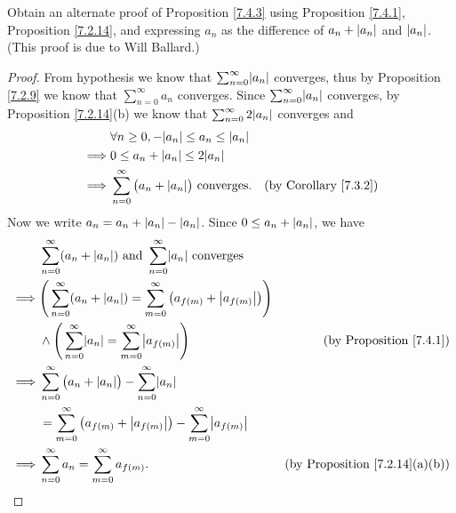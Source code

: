 \begin{exercise}\label{ex 7.4.2}
    Obtain an alternate proof of Proposition \ref{7.4.3} using Proposition \ref{7.4.1}, Proposition \ref{7.2.14}, and expressing \(a_n\) as the difference of \(a_n + \abs*{a_n}\) and \(\abs*{a_n}\).
    (This proof is due to Will Ballard.)
\end{exercise}

\begin{proof}
    From hypothesis we know that \(\sum_{n = 0}^\infty \abs*{a_n}\) converges, thus by Proposition \ref{7.2.9} we know that \(\sum_{n = 0}^\infty a_n\) converges.
    Since \(\sum_{n = 0}^\infty \abs*{a_n}\) converges, by Proposition \ref{7.2.14}(b) we know that \(\sum_{n = 0}^\infty 2 \abs*{a_n}\) converges and
    \begin{align*}
                 & \forall n \geq 0, -\abs*{a_n} \leq a_n \leq \abs*{a_n}                                                \\
        \implies & 0 \leq a_n + \abs*{a_n} \leq 2\abs*{a_n}                                                              \\
        \implies & \sum_{n = 0}^\infty \big(a_n + \abs*{a_n}\big) \text{ converges}. & \text{(by Corollary \ref{7.3.2})}
    \end{align*}
    Now we write \(a_n = a_n + \abs*{a_n} - \abs*{a_n}\).
    Since \(0 \leq a_n + \abs*{a_n}\), we have
    \begin{align*}
                 & \sum_{n = 0}^\infty (a_n + \abs*{a_n}) \text{ and } \sum_{n = 0}^\infty \abs*{a_n} \text{ converges}                                                       \\
        \implies & \Bigg(\sum_{n = 0}^\infty (a_n + \abs*{a_n}) = \sum_{m = 0}^\infty \big(a_{f(m)} + \abs*{a_{f(m)}}\big)\Bigg)                                              \\
                 & \land \Bigg(\sum_{n = 0}^\infty \abs*{a_n} = \sum_{m = 0}^\infty \abs*{a_{f(m)}}\Bigg)                        & \text{(by Proposition \ref{7.4.1})}        \\
        \implies & \sum_{n = 0}^\infty \big(a_n + \abs*{a_n}\big) - \sum_{n = 0}^\infty \abs*{a_n}                                                                            \\
                 & = \sum_{m = 0}^\infty \big(a_{f(m)} + \abs*{a_{f(m)}}\big) - \sum_{m = 0}^\infty \abs*{a_{f(m)}}                                                           \\
        \implies & \sum_{n = 0}^\infty a_n = \sum_{m = 0}^\infty a_{f(m)}.                                                       & \text{(by Proposition \ref{7.2.14}(a)(b))}
    \end{align*}
\end{proof}